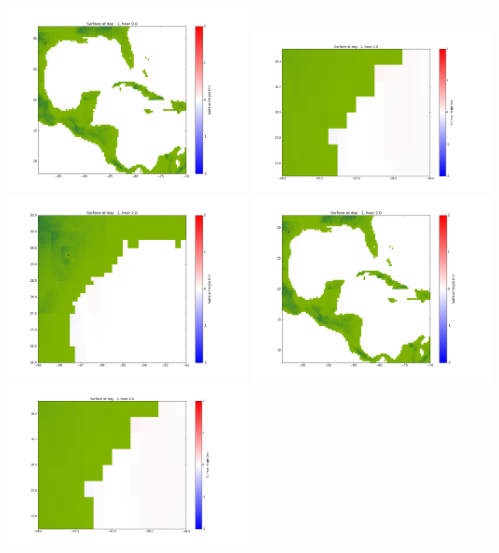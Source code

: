 \documentclass[11pt]{article}
\begin{document}
\vskip 10pt 
\includegraphics[width=0.475\textwidth]{frame0036fig1003.png}
\vskip 10pt 
\includegraphics[width=0.475\textwidth]{frame0037fig1001.png}
\includegraphics[width=0.475\textwidth]{frame0037fig1002.png}
\vskip 10pt 
\includegraphics[width=0.475\textwidth]{frame0037fig1003.png}
\vskip 10pt 
\includegraphics[width=0.475\textwidth]{frame0038fig1001.png}
\end{document}

